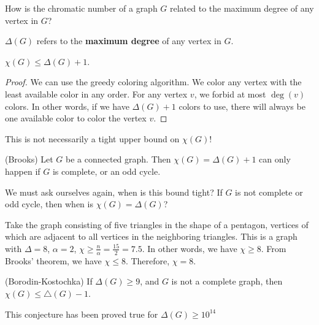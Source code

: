
How is the chromatic number of a graph \( G \) related to the maximum degree of any vertex in \( G \)?

\begin{definition}
	\( \Delta (G) \) refers to the \textbf{maximum degree} of any vertex in \( G \).
\end{definition}

\begin{prop}
	\( \chi(G) \le \Delta(G) + 1 \).
\end{prop}

\begin{proof}
	We can use the greedy coloring algorithm. We color any vertex with the least available color in any order. For any vertex \( v \), we forbid at most \( \deg(v)	 \) colors. In other words, if we have \( \Delta(G) + 1 \) colors to use, there will always be one available color to color the vertex \( v \).
\end{proof}

\begin{note}
	This is not necessarily a tight upper bound on \( \chi(G) \)!
\end{note}

\begin{theorem}
	(Brooks) Let \( G \) be a connected graph. Then \( \chi(G) = \Delta(G) + 1 \) can only happen if \( G \) is complete, or an odd cycle.
\end{theorem}

We must ask ourselves again, when is this bound tight? If \( G \) is not complete or odd cycle, then when is \( \chi(G) = \Delta(G) \)?

Take the graph consisting of five triangles in the shape of a pentagon, vertices of which are adjacent to all vertices in the neighboring triangles. This is a graph with \( \Delta = 8 \), \( \alpha =2 \), \( \chi \ge \frac{n}{\alpha } = \frac{15}{2} = 7.5 \). In other words, we have \( \chi \ge 8 \). From Brooks' theorem, we have \( \chi \le 8 \). Therefore, \( \chi =8 \).

\begin{conjecture}
	(Borodin-Kostochka) If \( \Delta(G) \ge 9 \), and \( G \) is not a complete graph, then \( \chi(G) \le  \triangle(G) - 1 \). 
\end{conjecture}

\begin{note}
	This conjecture has been proved true for \( \Delta(G) \ge 10^{14} \)
\end{note}


